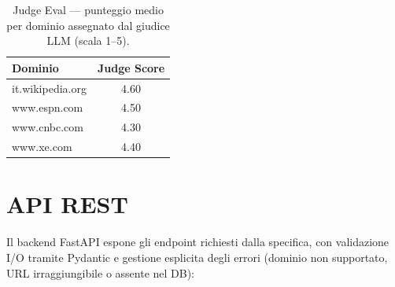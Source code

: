 \documentclass[11pt]{article}
\begin{document}
\begin{table}[h]
\centering
\small
\begin{tabular}{lc}
\toprule
\textbf{Dominio} & \textbf{Judge Score}\\
\midrule
it.wikipedia.org  & 4.60 \\
www.espn.com      & 4.50 \\
www.cnbc.com      & 4.30 \\
www.xe.com        & 4.40 \\
\bottomrule
\end{tabular}
\caption{Judge Eval — punteggio medio per dominio assegnato dal giudice LLM (scala 1--5).}
\end{table}


\section{API REST}

Il backend FastAPI espone gli endpoint richiesti dalla specifica, con validazione I/O tramite Pydantic e gestione esplicita degli errori (dominio non supportato, URL irraggiungibile o assente nel DB):
\end{document}
